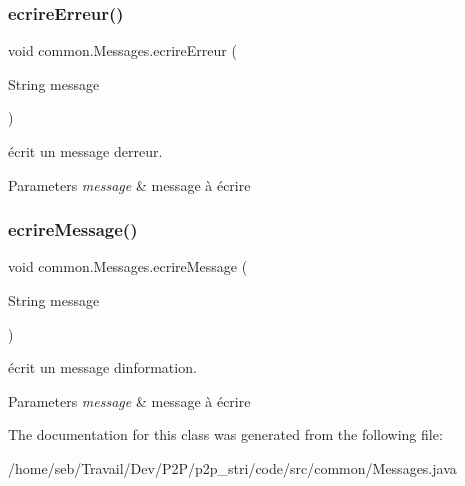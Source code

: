 \subsubsection{\texorpdfstring{ecrire\+Erreur()}{ecrireErreur()}}
{\footnotesize\ttfamily void common.\+Messages.\+ecrire\+Erreur (\begin{DoxyParamCaption}\item[{String}]{message }\end{DoxyParamCaption})\hspace{0.3cm}{\ttfamily [inline]}}



écrit un message d\textquotesingle{}erreur. 


\begin{DoxyParams}{Parameters}
{\em message} & message à écrire \\
\hline
\end{DoxyParams}
\mbox{\label{classcommon_1_1Messages_a6069bc66b0eda8fdd5966a7c7a8a1a0a}} 
\subsubsection{\texorpdfstring{ecrire\+Message()}{ecrireMessage()}}
{\footnotesize\ttfamily void common.\+Messages.\+ecrire\+Message (\begin{DoxyParamCaption}\item[{String}]{message }\end{DoxyParamCaption})\hspace{0.3cm}{\ttfamily [inline]}}



écrit un message d\textquotesingle{}information. 


\begin{DoxyParams}{Parameters}
{\em message} & message à écrire \\
\hline
\end{DoxyParams}


The documentation for this class was generated from the following file\+:\begin{DoxyCompactItemize}
\item 
/home/seb/\+Travail/\+Dev/\+P2\+P/p2p\+\_\+stri/code/src/common/Messages.\+java\end{DoxyCompactItemize}
